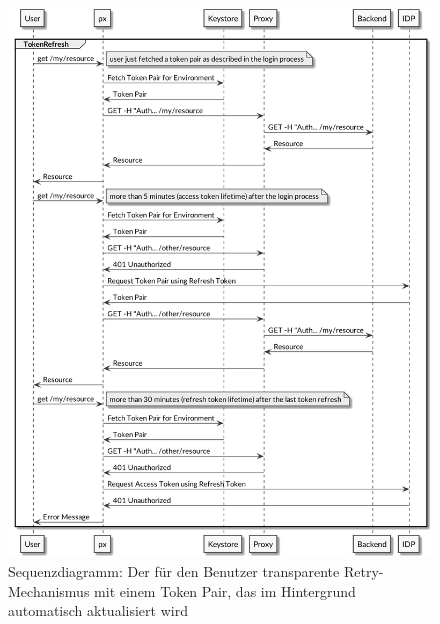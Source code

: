 \begin{figure}
    \centering
    \includegraphics[width=\linewidth]{pics/sequence-retry.png}
    \caption{Sequenzdiagramm: Der für den Benutzer transparente Retry-Mechanismus mit einem Token Pair, das im Hintergrund automatisch aktualisiert wird}
\end{figure}
